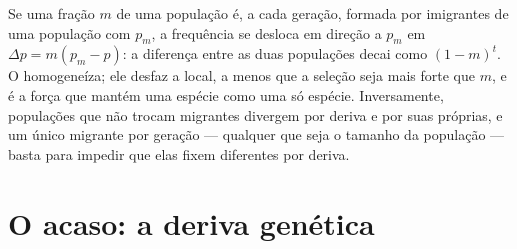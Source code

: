 \begin{proposition}\label{prop:b2:population-genetics:migration}
Se uma fração $m$ de uma população é, a cada geração, formada por
imigrantes de uma população com  $p_{m}$, a frequência
se desloca em direção a $p_{m}$ em $\Delta p = m(p_{m} - p)$: a diferença
entre as duas populações decai como $(1 - m)^{t}$. O \emph{} homogeneíza; ele desfaz a  local, a menos que a seleção
seja mais forte que $m$, e é a força que mantém uma espécie como uma só
espécie. Inversamente, populações que não trocam migrantes divergem por
deriva e por suas  próprias, e um único migrante por geração ---
qualquer que seja o tamanho da população --- basta para impedir que elas
fixem  diferentes por deriva.
\end{proposition}

\section{O acaso: a deriva genética}

